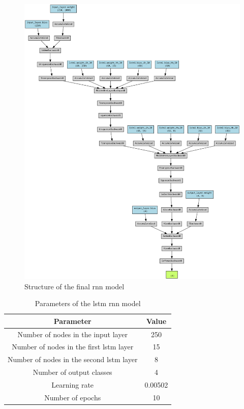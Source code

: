 \begin{figure}[h]
    \centering
    \includegraphics[scale=0.25]{images/rnn_struct.png}
    \caption{Structure of the final \acrshort{rnn} model}
    \label{fig:rnn_struct}
\end{figure}

\begin{table}[h]
    \centering
    \begin{tabular}{|c|c|}
        \hline
        \textbf{Parameter} & \textbf{Value} \\ \hline
        Number of nodes in the input layer & 250 \\ \hline
        Number of nodes in the first \acrshort{lstm} layer & 15 \\ \hline
        Number of nodes in the second \acrshort{lstm} layer & 8 \\ \hline
        Number of output classes & 4 \\ \hline
        Learning rate & 0.00502 \\ \hline
        Number of epochs & 10 \\ \hline
    \end{tabular}
    \caption{Parameters of the \acrshort{lstm} \acrshort{rnn} model}
    \label{table:rnn_params}
\end{table}

